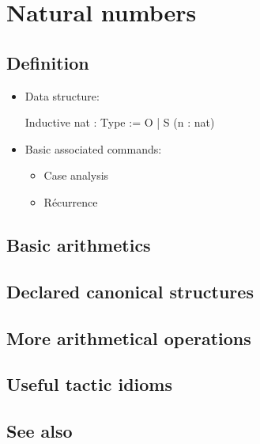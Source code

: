 \chapter{Natural numbers}

\section{Definition}

\begin{itemize}
\item Data structure:
\begin{coq}{}{}
Inductive nat : Type := O | S (n : nat)
\end{coq}

\item Basic associated commands:
  \begin{itemize}
    \item Case analysis
    \item Récurrence
  \end{itemize}
\end{itemize}

\section{Basic arithmetics}



\section{Declared canonical structures}


\section{More arithmetical operations}


\section{Useful tactic idioms}


\section{See also}




\newpage